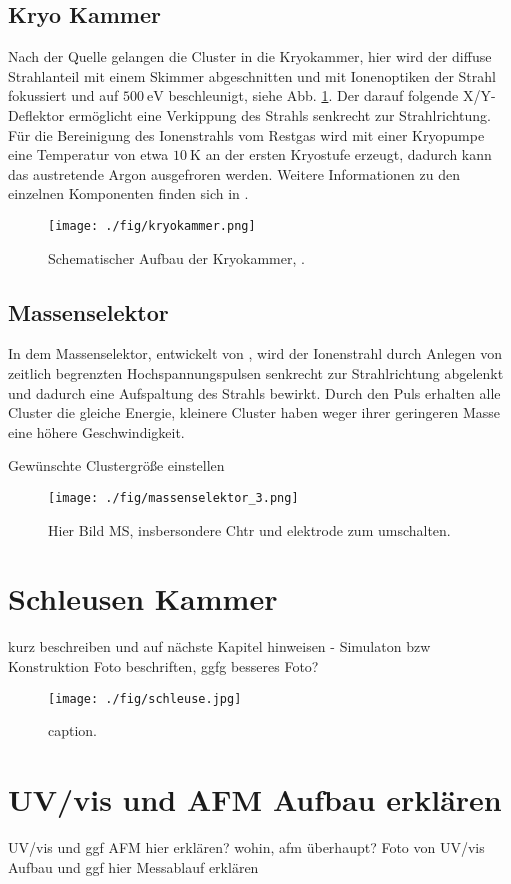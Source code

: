 \subsection{Kryo Kammer}
Nach der Quelle gelangen die Cluster in die Kryokammer, hier wird der diffuse Strahlanteil mit einem Skimmer abgeschnitten und mit Ionenoptiken der Strahl fokussiert und auf $\SI{500}{\eV}$ beschleunigt, siehe Abb. \ref{fig:kryokammer}.
Der darauf folgende X/Y-Deflektor ermöglicht eine Verkippung des Strahls senkrecht zur Strahlrichtung.
Für die Bereinigung des Ionenstrahls vom Restgas wird mit einer Kryopumpe eine Temperatur von etwa $\SI{10}{\kelvin}$ \cite[S. 27]{woltermaster} an der ersten Kryostufe erzeugt, dadurch kann das austretende Argon ausgefroren werden.
Weitere Informationen zu den einzelnen Komponenten finden sich in \cite{krause}.
\begin{figure}
    \centering
    \texttt{[image: ./fig/kryokammer.png]}
    \caption{Schematischer Aufbau der Kryokammer, \cite{woltermaster}.}
    \label{fig:kryokammer}
\end{figure}

\subsection{Massenselektor}
In dem Massenselektor, entwickelt von \cite{Issendorff.1999}, wird der Ionenstrahl durch Anlegen von zeitlich begrenzten Hochspannungspulsen senkrecht zur Strahlrichtung abgelenkt und dadurch eine Aufspaltung des Strahls bewirkt.
Durch den Puls erhalten alle Cluster die gleiche Energie, kleinere Cluster haben weger ihrer geringeren Masse eine höhere Geschwindigkeit.

Gewünschte Clustergröße einstellen 

\begin{figure}
    \centering
    \texttt{[image: ./fig/massenselektor\_3.png]}
    \caption{Hier Bild MS, insbersondere Chtr und elektrode zum umschalten.}
    \label{fig:mschtr}
\end{figure}


\section{Schleusen Kammer}
\label{sec:schleuse}

kurz beschreiben und auf nächste Kapitel hinweisen - Simulaton bzw Konstruktion
Foto beschriften, ggfg besseres Foto?
\begin{figure}
    \centering
    \texttt{[image: ./fig/schleuse.jpg]}
    \caption{caption.}
    \label{fig:schleuse}
\end{figure}


\section{UV/vis und AFM Aufbau erklären}
UV/vis und ggf AFM hier erklären? wohin, afm überhaupt?
Foto von UV/vis Aufbau und ggf hier Messablauf erklären
